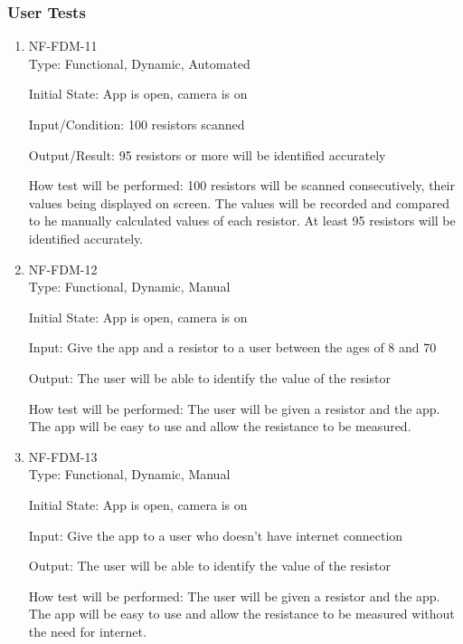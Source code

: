 \documentclass[12pt, titlepage]{article}
\begin{document}
\subsubsection{User Tests}
\begin{enumerate}
\item{NF-FDM-11\\}
Type: Functional, Dynamic, Automated
					
Initial State: 
App is open, camera is on
					
Input/Condition: 
100 resistors scanned
					
Output/Result: 
95 resistors or more will be identified accurately
					
How test will be performed: 
100 resistors will be scanned consecutively, their values being displayed on screen. The values will be recorded and compared to he manually calculated values of each resistor. At least 95 resistors will be identified accurately.
					
\item{NF-FDM-12\\}
Type: Functional, Dynamic, Manual
					
Initial State: 
App is open, camera is on
					
Input: 
Give the app and a resistor to a user between the ages of 8 and 70
					
Output: 
The user will be able to identify the value of the resistor
					
How test will be performed: 
The user will be given a resistor and the app. The app will be easy to use and allow the resistance to be measured.

\item{NF-FDM-13\\}
Type: Functional, Dynamic, Manual
					
Initial State: 
App is open, camera is on
					
Input: 
Give the app to a user who doesn't have internet connection
					
Output: 
The user will be able to identify the value of the resistor
					
How test will be performed: 
The user will be given a resistor and the app. The app will be easy to use and allow the resistance to be measured without the need for internet.

\end{enumerate}
\end{document}
